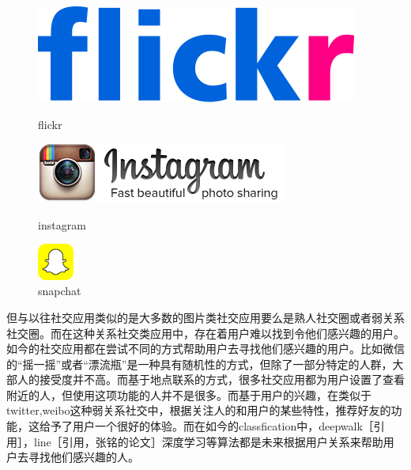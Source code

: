 \begin{figure}[h] 
\begin{minipage}[t]{0.3\linewidth}
\centering
\includegraphics[width=\textwidth]{img/chap1/flickr.png}
\caption{flickr \label{flickr}}
\end{minipage}
\hfill
\begin{minipage}[t]{0.3\linewidth}
\centering
\includegraphics[width=\textwidth]{img/chap1/instagram.png}
\caption{instagram\label{instagram}}
\end{minipage}
\begin{minipage}[t]{0.3\linewidth}
\centering
\includegraphics[width=1.2cm,height=1.2cm]{img/chap1/snapchat.png}
\caption{snapchat\label{snapchat}}
\end{minipage}

\end{figure}

但与以往社交应用类似的是大多数的图片类社交应用要么是熟人社交圈或者弱关系社交圈。而在这种关系社交类应用中，存在着用户难以找到令他们感兴趣的用户。如今的社交应用都在尝试不同的方式帮助用户去寻找他们感兴趣的用户。比如微信的“摇一摇”或者“漂流瓶”是一种具有随机性的方式，但除了一部分特定的人群，大部人的接受度并不高。而基于地点联系的方式，很多社交应用都为用户设置了查看附近的人，但使用这项功能的人并不是很多。而基于用户的兴趣，在类似于twitter,weibo这种弱关系社交中，根据关注人的和用户的某些特性，推荐好友的功能，这给予了用户一个很好的体验。而在如今的classfication中，deepwalk［引用］，line［引用，张铭的论文］深度学习等算法都是未来根据用户关系来帮助用户去寻找他们感兴趣的人。

